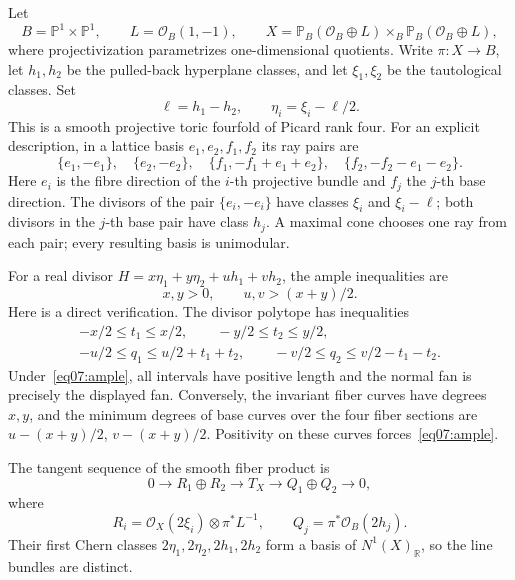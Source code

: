 \documentclass[11pt]{amsart}
\theoremstyle{definition}
\theoremstyle{remark}
\newcommand{\RR}{\mathbb R}
\newcommand{\PP}{\mathbb P}
\begin{document}
Let
\[
 B=\PP^1\times\PP^1,\qquad L=\mathcal O_B(1,-1),\qquad
 X=\PP_B(\mathcal O_B\oplus L)
            \times_B\PP_B(\mathcal O_B\oplus L),
\]
where projectivization parametrizes one-dimensional quotients.
Write \(\pi:X\to B\), let \(h_1,h_2\) be the pulled-back
hyperplane classes, and let \(\xi_1,\xi_2\) be the tautological
classes. Set
\[
 \ell=h_1-h_2,\qquad \eta_i=\xi_i-\ell/2.
\]
This is a smooth projective toric fourfold of Picard rank four.
For an explicit description, in a lattice basis \(e_1,e_2,f_1,f_2\)
its ray pairs are
\[
 \{e_1,-e_1\},\quad\{e_2,-e_2\},\quad
 \{f_1,-f_1+e_1+e_2\},\quad
 \{f_2,-f_2-e_1-e_2\}.
\]
Here \(e_i\) is the fibre direction of the \(i\)-th projective
bundle and \(f_j\) the \(j\)-th base direction. The divisors of
the pair \(\{e_i,-e_i\}\) have classes \(\xi_i\) and
\(\xi_i-\ell\); both divisors in the \(j\)-th base pair have
class \(h_j\). A maximal cone chooses one ray from each pair; every resulting
basis is unimodular.

For a real divisor \(H=x\eta_1+y\eta_2+uh_1+vh_2\), the
ample inequalities are
\begin{equation}\label{eq07:ample}
 x,y>0,\qquad u,v>(x+y)/2.
\end{equation}
Here is a direct verification. The divisor polytope has inequalities
\[
 \begin{gathered}
 -x/2\leq t_1\leq x/2,\qquad
 -y/2\leq t_2\leq y/2,\\
 -u/2\leq q_1\leq u/2+t_1+t_2,\qquad
 -v/2\leq q_2\leq v/2-t_1-t_2.
 \end{gathered}
\]
Under~\eqref{eq07:ample}, all intervals have positive length
and the normal fan is precisely the displayed fan.
Conversely, the invariant fiber curves have degrees \(x,y\),
and the minimum degrees of base curves over the four fiber
sections are \(u-(x+y)/2\), \(v-(x+y)/2\).
Positivity on these curves forces~\eqref{eq07:ample}.

The tangent sequence of the smooth fiber product is
\begin{equation}\label{eq07:tangent}
 0\longrightarrow R_1\oplus R_2\longrightarrow T_X
          \longrightarrow Q_1\oplus Q_2\longrightarrow0,
\end{equation}
where
\[
 R_i=\mathcal O_X(2\xi_i)\otimes\pi^*L^{-1},\qquad
 Q_j=\pi^*\mathcal O_B(2h_j).
\]
Their first Chern classes \(2\eta_1,2\eta_2,2h_1,2h_2\)
form a basis of \(N^1(X)_\RR\), so the line bundles are distinct.
\end{document}
